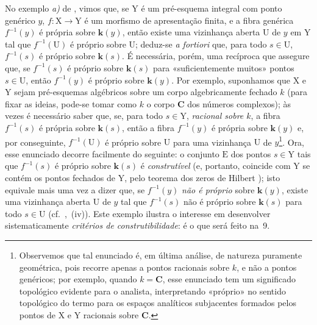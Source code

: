 \begin{env}[8.1.3]
\label{IV.8.1.3}
No exemplo \emph{a)} de , vimos que, se $\mathrm{Y}$ é um pré-esquema integral com ponto genérico $y$, $f:\mathrm{X}\to\mathrm{Y}$ é um morfismo de apresentação finita, e a fibra genérica $f^{-1}(y)$ é própria sobre $\boldsymbol{k}(y)$, então existe uma vizinhança aberta $\mathrm{U}$ de $y$ em $\mathrm{Y}$ tal que $f^{-1}(\mathrm{U})$ é próprio sobre $\mathrm{U}$; deduz-se \emph{a fortiori} que, para todo $s\in\mathrm{U}$, $f^{-1}(s)$ é próprio sobre $\boldsymbol{k}(s)$.
É necessária, porém, uma recíproca que assegure que, se $f^{-1}(s)$ é próprio sobre $\boldsymbol{k}(s)$ para «suficientemente muitos» pontos $s\in\mathrm{U}$, então $f^{-1}(y)$ é próprio sobre $\boldsymbol{k}(y)$.
Por exemplo, suponhamos que $\mathrm{X}$ e $\mathrm{Y}$ sejam pré-esquemas algébricos sobre um corpo algebricamente fechado $k$ (para fixar as ideias, pode-se tomar como $k$ o corpo $\mathbf{C}$ dos números complexos); às vezes é necessário saber que, se, para todo $s\in\mathrm{Y}$, \emph{racional sobre $k$}, a fibra $f^{-1}(s)$ é própria sobre $\boldsymbol{k}(s)$, então a fibra $f^{-1}(y)$ é própria sobre $\boldsymbol{k}(y)$ e, por conseguinte, $f^{-1}(\mathrm{U})$ é próprio sobre $\mathrm{U}$ para uma vizinhança $\mathrm{U}$ de $y$\footnote{Observemos que tal enunciado é, em última análise, de natureza puramente geométrica, pois recorre apenas a pontos racionais sobre $k$, e não a pontos genéricos; por exemplo, quando $k=\mathbf{C}$, esse enunciado tem um significado topológico evidente para o analista, interpretando «próprio» no sentido topológico do termo para os espaços analíticos subjacentes formados pelos pontos de $\mathrm{X}$ e $\mathrm{Y}$ racionais sobre $\mathbf{C}$.}.
Ora, esse enunciado decorre facilmente do seguinte: o conjunto $\mathrm{E}$ dos pontos $s\in\mathrm{Y}$ tais que $f^{-1}(s)$ é próprio sobre $\boldsymbol{k}(s)$ é \emph{construtível} (e, portanto, coincide com $\mathrm{Y}$ se contém os pontos fechados de $\mathrm{Y}$, pelo teorema dos zeros de Hilbert ); isto equivale mais uma vez a dizer que, se $f^{-1}(y)$ \emph{não é próprio} sobre $\boldsymbol{k}(y)$, existe uma vizinhança aberta $\mathrm{U}$ de $y$ tal que $f^{-1}(s)$ não é próprio sobre $\boldsymbol{k}(s)$ para todo $s\in\mathrm{U}$ (cf.\ ,~(iv)).
Este exemplo ilustra o interesse em desenvolver sistematicamente \emph{critérios de construtibilidade}: é o que será feito na \textsection\,9.
\end{env}

